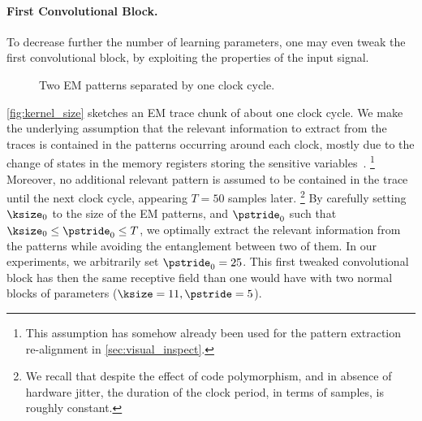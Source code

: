 \paragraph{First Convolutional Block.}
To decrease further the number of learning parameters, one may even tweak the first convolutional block, by exploiting the properties of the input signal.
\begin{figure}    %
	\centering
	\caption{Two EM patterns separated by one clock cycle.}
	\label{fig:kernel_size}
\end{figure}
\autoref{fig:kernel_size} sketches an EM trace chunk of about one clock cycle.
We make the underlying assumption that the relevant information to extract from the traces is contained in the patterns occurring around each clock, mostly due to the change of states in the memory registers storing the sensitive variables~\cite{mangard_power_2007}.%
\footnote{This assumption has somehow already been used for the pattern extraction re-alignment in \autoref{sec:visual_inspect}.}
Moreover, no additional relevant pattern is assumed to be contained in the trace until the next clock cycle, appearing \(T=50\) samples later.%
\footnote{
	We recall that despite the effect of code polymorphism, and in absence of hardware jitter, the duration of the clock period, in terms of samples, is roughly constant.
}
By carefully setting \(\ksize_0\) to the size of the EM patterns, and \(\pstride_0\) such that \(\ksize_0 \leq \pstride_0 \leq T\), we optimally extract the relevant information from the patterns while avoiding the entanglement between two of them.
In our experiments, we arbitrarily set \(\pstride_0=25\).
This first tweaked convolutional block has then the same receptive field than one would have with two normal blocks of parameters (\(\ksize=11, \pstride=5\)).

